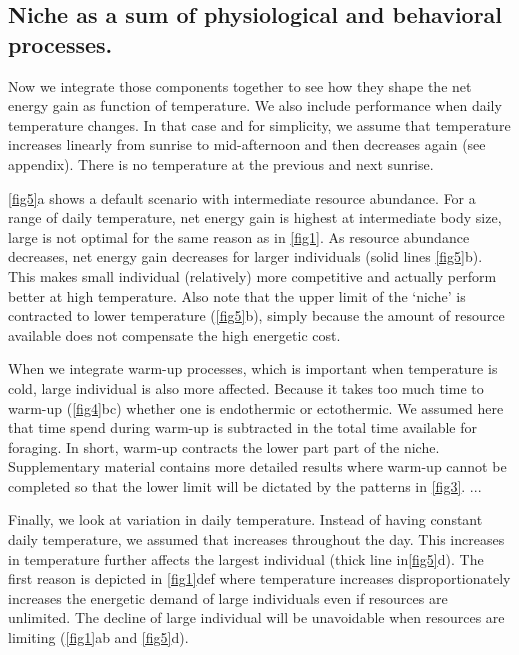 \subsection*{Niche as a sum of physiological and behavioral processes.}
Now we integrate those components together to see how they shape the net energy gain as function of temperature. 
We also include performance when daily temperature changes. 
In that case and for simplicity, we assume that temperature increases linearly from sunrise to mid-afternoon and then decreases again (see appendix). 
There is no temperature at the previous and next sunrise.

\cref{fig5}a shows a default scenario with intermediate resource abundance.
For a range of daily temperature, net energy gain is highest at intermediate body size, large is not optimal for the same reason as in \cref{fig1}.
As resource abundance decreases, net energy gain decreases for larger individuals (solid lines \cref{fig5}b).
This makes small individual (relatively) more competitive and actually perform better at high temperature.
Also note that the upper limit of the `niche' is contracted to lower temperature (\cref{fig5}b), simply because the amount of resource available does not compensate the high energetic cost.

When we integrate warm-up processes, which is important when temperature is cold, large individual is also more affected.
Because it takes too much time to warm-up (\cref{fig4}bc) whether one is endothermic or ectothermic.
We assumed here that time spend during warm-up is subtracted in the total time available for foraging.
In short, warm-up contracts the lower part part of the niche.
Supplementary material contains more detailed results where warm-up cannot be completed so that the lower limit will be dictated by the patterns in \cref{fig3}.
...

Finally, we look at variation in daily temperature.
Instead of having constant daily temperature, we assumed that increases throughout the day.
This increases in temperature further affects the largest individual (thick line in\cref{fig5}d).
The first reason is depicted in \cref{fig1}def where temperature increases disproportionately increases the energetic demand of large individuals even if resources are unlimited.
The decline of large individual will be unavoidable when resources are limiting (\cref{fig1}ab and \cref{fig5}d).



